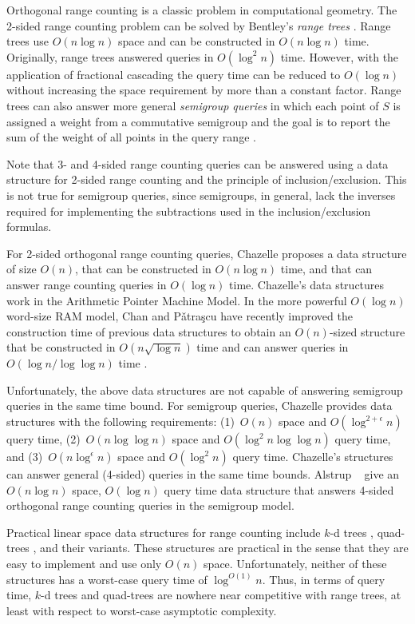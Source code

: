 \documentclass{patmorin}
\begin{document}
Orthogonal range counting is a classic problem in computational
geometry.  The 2-sided range counting problem can be solved by
Bentley's \emph{range trees} \cite{ae42}.  Range trees use $O(n\log
n)$ space and can be constructed in $O(n\log n)$ time.  Originally,
range trees answered queries in $O(\log^2 n)$ time.  However, with the
application of fractional cascading \cite{ae76,ae196} the query time can
be reduced to $O(\log n)$ without increasing the space requirement by
more than a constant factor.  Range trees can also answer more general
\emph{semigroup queries} in which each point of $S$ is assigned a weight
from a commutative semigroup and the goal is to report the sum of the
weight of all points in the query range \cite{ae133,ae292}.

Note that 3- and 4-sided range counting queries can be answered
using a data structure for 2-sided range counting and the principle
of inclusion/exclusion.  This is not true for semigroup queries, since
semigroups, in general, lack the inverses required for implementing the
subtractions used in the inclusion/exclusion formulas.  

For 2-sided orthogonal range counting queries, Chazelle \cite{ae55,ae58}
proposes a data structure of size $O(n)$, that can be constructed in
$O(n\log n)$ time, and that can answer range counting queries in $O(\log
n)$ time.  Chazelle's data structures work in the Arithmetic Pointer
Machine Model.  In the more powerful $O(\log n)$ word-size RAM model,
Chan and P\v{a}tra\c{s}cu have recently improved the construction time of
previous data structures \cite{jms04} to obtain an $O(n)$-sized structure
that be constructed in $O(n\sqrt{\log n})$ time and can answer queries
in $O(\log n/\log\log n)$ time \cite{cp10}.

Unfortunately, the above data structures are not capable of answering
semigroup queries in the same time bound.  For semigroup queries, Chazelle
provides data structures with the following requirements: (1)~$O(n)$ space
and $O(\log^{2+\epsilon} n)$ query time, (2)~$O(n\log\log n)$ space and
$O(\log^{2}n\log\log n)$ query time, and (3)~$O(n\log^\epsilon n)$ space
and $O(\log^2 n)$ query time.  Chazelle's structures can answer general
(4-sided) queries in the same time bounds.  Alstrup \etal\ \cite{abr00}
give an $O(n\log n)$ space, $O(\log n)$ query time data structure that
answers 4-sided orthogonal range counting queries in the semigroup model.

Practical linear space data structures for range counting include $k$-d
trees \cite{ae41}, quad-trees \cite{ae251}, and their variants.  These
structures are practical in the sense that they are easy to implement and
use only $O(n)$ space.  Unfortunately, neither of these structures has a
worst-case query time of $\log^{O(1)} n$.  Thus, in terms of query time,
$k$-d trees and quad-trees are nowhere near competitive with range trees,
at least with respect to worst-case asymptotic complexity.
\end{document}
